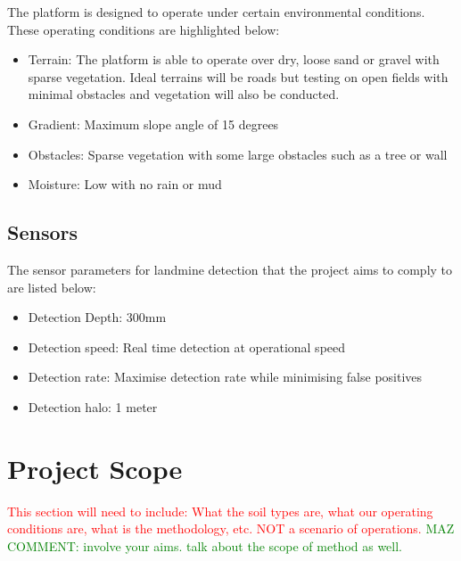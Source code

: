 \documentclass[main.tex]{subfiles}
\begin{document}
The platform is designed to operate under certain environmental conditions. These operating conditions are highlighted below:
\begin{itemize}
\item Terrain: The platform is able to operate over dry, loose sand or gravel with sparse vegetation. Ideal terrains will be roads but testing on open fields with minimal obstacles and vegetation will also be conducted.
\item Gradient: Maximum slope angle of 15 degrees
\item Obstacles: Sparse vegetation with some large obstacles such as a tree or wall
\item Moisture: Low with no rain or mud
\end{itemize}
\subsection{Sensors}
The sensor parameters for landmine detection that the project aims to comply to are listed below:
\begin{itemize}
\item Detection Depth: 300mm 
\item Detection speed: Real time detection at operational speed
\item Detection rate: Maximise detection rate while minimising false positives
\item Detection halo: 1 meter %
\end{itemize}

\section{Project Scope}
\textcolor{red}{This section will need to include: What the soil types are, what our operating conditions are, what is the methodology, etc. NOT a scenario of operations.} 
\textcolor{green}{MAZ COMMENT: involve your aims. talk about the scope of method as well.}
\end{document}
